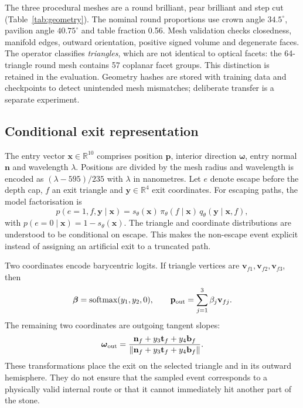 \documentclass[conference]{IEEEtran}
\newcommand{\dg}{^{\circ}}
\newcommand{\R}{\mathbb{R}}
\begin{document}
The three procedural meshes are a round brilliant, pear brilliant and step cut
(Table~\ref{tab:geometry}). The nominal round proportions use crown angle
$34.5\dg$, pavilion angle $40.75\dg$ and table fraction 0.56. Mesh validation
checks closedness, manifold edges, outward orientation, positive signed volume
and degenerate faces. The operator classifies \emph{triangles}, which are not
identical to optical facets: the 64-triangle round mesh contains 57 coplanar
facet groups. This distinction is retained in the evaluation. Geometry hashes
are stored with training data and checkpoints to detect unintended mesh
mismatches; deliberate transfer is a separate experiment.

\subsection{Conditional exit representation}
The entry vector $\mathbf{x}\in\R^{10}$ comprises position $\mathbf{p}$,
interior direction $\boldsymbol\omega$, entry normal $\mathbf{n}$ and wavelength
$\lambda$. Positions are divided by the mesh radius and wavelength is encoded
as $(\lambda-595)/235$ with $\lambda$ in nanometres. Let $e$ denote escape before
the depth cap, $f$ an exit triangle and $\mathbf{y}\in\R^4$ exit coordinates.
For escaping paths, the model factorisation is
\begin{equation}
 p(e=1,f,\mathbf{y}\mid\mathbf{x})=
 s_\theta(\mathbf{x})\,\pi_\theta(f\mid\mathbf{x})\,
 q_\theta(\mathbf{y}\mid\mathbf{x},f),
\end{equation}
with $p(e=0\mid\mathbf{x})=1-s_\theta(\mathbf{x})$. The triangle and coordinate
distributions are understood to be conditional on escape. This makes the
non-escape event explicit instead of assigning an artificial exit to a
truncated path.

Two coordinates encode barycentric logits. If triangle vertices are
$\mathbf{v}_{f1},\mathbf{v}_{f2},\mathbf{v}_{f3}$, then
\begin{equation}
 \boldsymbol\beta=\operatorname{softmax}(y_1,y_2,0),\qquad
 \mathbf{p}_{\rm out}=\sum_{j=1}^{3}\beta_j\mathbf{v}_{fj}.
\end{equation}
The remaining two coordinates are outgoing tangent slopes:
\begin{equation}
 \boldsymbol\omega_{\rm out}=
 \frac{\mathbf{n}_f+y_3\mathbf{t}_f+y_4\mathbf{b}_f}
 {\|\mathbf{n}_f+y_3\mathbf{t}_f+y_4\mathbf{b}_f\|}.
\end{equation}
These transformations place the exit on the selected triangle and in its
outward hemisphere. They do not ensure that the sampled event corresponds to a
physically valid internal route or that it cannot immediately hit another part
of the stone.
\end{document}
